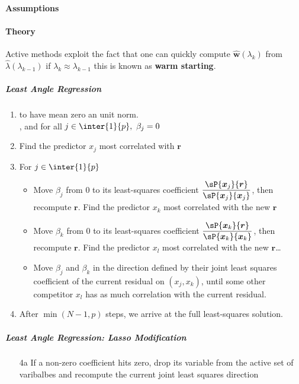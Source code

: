 \paragraph{Assumptions}
\paragraph{Theory}
Active methods exploit the fact that one can quickly compute $\hat{\bm{w}}(\lambda_{k})$ from 
$\hat{\lambda}(\lambda_{k-1})$ if $\lambda_{k}\approx\lambda_{k-1}$ this is known as \textbf{warm
starting}.

\subparagraph{Least Angle Regression}
\begin{enumerate}
	\item {} to have mean zero an unit 
		norm.\\ , and for all $j\in\inter{1}{p},~\beta_{j}=0$
    \item Find the predictor $x_{j}$ most correlated with $\bm{r}$
    \item For $j\in\inter{1}{p}$
    \begin{itemize}
        \item Move $\beta_{j}$ from 0 to its least-squares coefficient
            $\dfrac{\sP{\bm{x}_{j}}{\bm{r}}}{\sP{\bm{x}_{j}}{\bm{x}_{j}}}$, then recompute 
            $\bm{r}$. Find the predictor $x_{k}$ most correlated with the new $\bm{r}$
        \item Move $\beta_{k}$ from 0 to its least-squares coefficient
            $\dfrac{\sP{\bm{x}_{k}}{\bm{r}}}{\sP{\bm{x}_{k}}{\bm{x}_{k}}}$, then recompute 
            $\bm{r}$. Find the predictor $x_{l}$ most correlated with the new $\bm{r}$\dots
        \item Move $\beta_{j}$ and $\beta_{k}$ in the direction defined
            by their joint least squares coefficient of the current
            residual on $(x_{j},x_{k})$, until some other 
            competitor $x_{l}$ has as much correlation with the
            current residual.
    \end{itemize}
	\item After $\min(N-1, p)$ steps, we arrive at the
		full least-squares solution.
\end{enumerate}

\subparagraph{Least Angle Regression: Lasso Modification}
\begin{itemize}
	\item[4a] If a non-zero coefficient hits zero, drop its variable from the
		active set of varibalbes and recompute the current joint least squares
		direction
\end{itemize}


